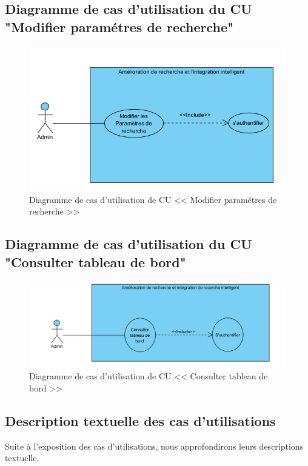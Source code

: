 \newpage
\subsection{Diagramme de cas d'utilisation du CU "Modifier paramétres de recherche"}
\begin{figure}[H]
	\centering
	\includegraphics[width=1\textwidth]{logos/cusprint3.png}
	\caption{Diagramme de cas d'utilisation de CU << Modifier paramétres de recherche >>}
	\label{fig:cusprint3}
\end{figure}

\subsection{Diagramme de cas d'utilisation du CU "Consulter tableau de bord"}
\begin{figure}[H]
	\centering
	\includegraphics[width=1\textwidth]{logos/consultertb.png}
	\caption{Diagramme de cas d'utilisation de CU << Consulter tableau de bord >>}
	\label{fig:consultertb}
\end{figure}



\subsection{Description textuelle des cas d'utilisations}
\noindent
Suite à l'exposition des cas d'utilisations, nous approfondirons leurs descriptions textuelle.

